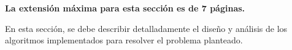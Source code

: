 \begin{mdframed}
    \textbf{La extensión máxima para esta sección es de 7 páginas.}
\end{mdframed}

En esta sección, se debe describir detalladamente el diseño y análisis de los algoritmos implementados para resolver el problema planteado.